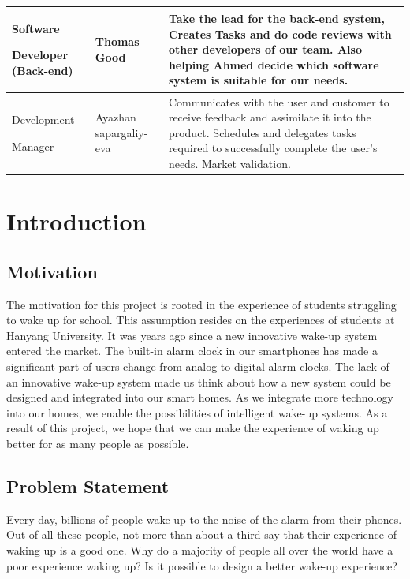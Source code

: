 \documentclass[conference]{IEEEtran}
\begin{document}
\begin{table}
\def\arraystretch{1.24} \small
    \begin{tabular}{|p{1.8cm}|p{1.4cm}|p{4.4cm}|}
        \hline
        Software\par Developer (Back-end) & Thomas Good &Take the lead for the back-end system, Creates Tasks and do code reviews with other developers of our team. Also helping Ahmed decide which software system is suitable for our needs.\\ \hline         
        
        Development \par Manager & Ayazhan sapargaliy-eva & Communicates with the user and customer to receive feedback and assimilate it into the product. Schedules and delegates tasks required to successfully complete the user’s needs. Market validation. \\ \hline
    \end{tabular}
\end{table}


\section{Introduction}
\subsection{Motivation}
The motivation for this project is rooted in the experience of students struggling to wake up for school. This assumption resides on the experiences of students at Hanyang University. It was years ago since a new innovative wake-up system entered the market. The built-in alarm clock in our smartphones has made a significant part of users change from analog to digital alarm clocks. The lack of an innovative wake-up system made us think about how a new system could be designed and integrated into our smart homes. As we integrate more technology into our homes, we enable the possibilities of intelligent wake-up systems.
As a result of this project, we hope that we can make the experience of waking up better for as many people as possible.

\subsection{Problem Statement}
Every day, billions of people wake up to the noise of the alarm from their phones. Out of all these people, not more than about a third say that their experience of waking up is a good one. Why do a majority of people all over the world have a poor experience waking up? Is it possible to design a better wake-up experience?
\end{document}
